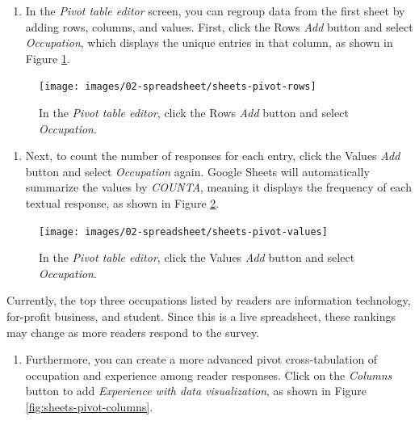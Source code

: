 \documentclass[
  english,
]{book}
\providecommand{\tightlist}{%
  \setlength{\itemsep}{0pt}\setlength{\parskip}{0pt}}
\begin{document}
\begin{enumerate}
\def\labelenumi{\arabic{enumi}.}
\setcounter{enumi}{3}
\tightlist
\item
  In the \emph{Pivot table editor} screen, you can regroup data from the first sheet by adding rows, columns, and values. First, click the Rows \emph{Add} button and select \emph{Occupation}, which displays the unique entries in that column, as shown in Figure \ref{fig:sheets-pivot-rows}.
\end{enumerate}



\begin{figure}
\texttt{[image: images/02-spreadsheet/sheets-pivot-rows]} \caption{In the \emph{Pivot table editor}, click the Rows \emph{Add} button and select \emph{Occupation}.}\label{fig:sheets-pivot-rows}
\end{figure}

\begin{enumerate}
\def\labelenumi{\arabic{enumi}.}
\setcounter{enumi}{4}
\tightlist
\item
  Next, to count the number of responses for each entry, click the Values \emph{Add} button and select \emph{Occupation} again. Google Sheets will automatically summarize the values by \emph{COUNTA}, meaning it displays the frequency of each textual response, as shown in Figure \ref{fig:sheets-pivot-values}.
\end{enumerate}



\begin{figure}
\texttt{[image: images/02-spreadsheet/sheets-pivot-values]} \caption{In the \emph{Pivot table editor}, click the Values \emph{Add} button and select \emph{Occupation}.}\label{fig:sheets-pivot-values}
\end{figure}

Currently, the top three occupations listed by readers are information technology, for-profit business, and student. Since this is a live spreadsheet, these rankings may change as more readers respond to the survey.

\begin{enumerate}
\def\labelenumi{\arabic{enumi}.}
\setcounter{enumi}{5}
\tightlist
\item
  Furthermore, you can create a more advanced pivot cross-tabulation of occupation and experience among reader responses. Click on the \emph{Columns} button to add \emph{Experience with data visualization}, as shown in Figure \ref{fig:sheets-pivot-columns}.
\end{enumerate}
\end{document}
